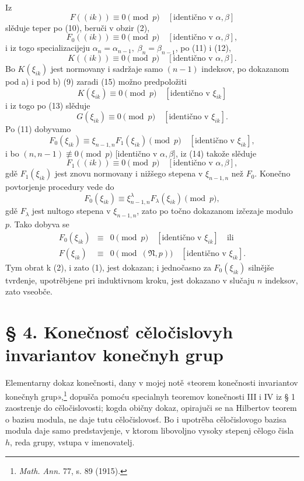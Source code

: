 \documentclass[11pt]{article}
\providecommand{\frN}{\mathfrak N}
\begin{document}
Iz
\[
        F((ik))\equiv0\pmod p\quad [\text{identično v \(\alpha,\beta\)}]
\]
slěduje teper po (10), beruči v obzir (2),
\begin{equation}
        F_0((ik))\equiv0\pmod p\quad [\text{identično v \(\alpha,\beta\)}],
\end{equation}
i iz togo specializacijeju \(\alpha_n=\alpha_{n-1},\;\beta_n=\beta_{n-1}\), po (11) i (12),
\begin{equation}
        K((ik))\equiv0\pmod p\quad [\text{identično v \(\alpha,\beta\)}].
\end{equation}
Bo \(K(\xi_{ik})\) jest normovany i sadržaje samo \((n-1)\) indeksov, po dokazanom pod a) i pod b) (9) zaradi (15) možno predpoložiti
\[
        K(\xi_{ik})\equiv0\pmod p\quad [\text{identično v \(\xi_{ik}\)}]
\]
i iz togo po (13) slěduje
\[
        G(\xi_{ik})\equiv0\pmod p\quad [\text{identično v \(\xi_{ik}\)}].
\]
Po (11) dobyvamo
\[
        F_0(\xi_{ik})\equiv\xi_{n-1,n}F_1(\xi_{ik})\pmod p\quad [\text{identično v \(\xi_{ik}\)}],
\]
i bo \((n,n-1)\not\equiv0\pmod p\) [identično v \(\alpha,\beta\)], iz (14) takože slěduje
\[
        F_1((ik))\equiv0\pmod p\quad [\text{identično v \(\alpha,\beta\)}],
\]
gdě \(F_1(\xi_{ik})\) jest znovu normovany i nižšego stepena v \(\xi_{n-1,n}\) než \(F_0\). Konečno povtorjenje procedury vede do
\[
        F_0(\xi_{ik})\equiv\xi_{n-1,n}^{\lambda}F_\lambda(\xi_{ik})\pmod p,
\]
gdě \(F_\lambda\) jest nultogo stepena v \(\xi_{n-1,n}\), zato po točno dokazanom izčezaje modulo \(p\). Tako dobyva se
\begin{equation}
\begin{array}{rcl}
        F_0(\xi_{ik})&\equiv&0\pmod p\quad [\text{identično v \(\xi_{ik}\)}]\quad \text{ili}\\
        F(\xi_{ik})&\equiv&0\pmod{(\frN,p)}\quad [\text{identično v \(\xi_{ik}\)}].
\end{array}
\end{equation}
Tym obrat k (2), i zato (1), jest dokazan; i jednočasno za \(F_0(\xi_{ik})\) silnějše tvrđenje, upotrěbjene pri induktivnom kroku, jest dokazano v slučaju \(n\) indeksov, zato vseobče.

\setcounter{equation}{0}
\section*{§ 4. Konečnosť cěločislovyh invariantov konečnyh grup}

Elementarny dokaz konečnosti, dany v mojej notě «teorem konečnosti invariantov konečnyh grup»,\footnote{\emph{Math. Ann.} 77, s. 89 (1915).} dopušča pomoću specialnyh teoremov konečnosti III i IV iz § 1 zaostrenje do cěločislovosti; kogda običny dokaz, opirajuči se na Hilbertov teorem o bazisu modula, ne daje tutu cěločislovosť. Bo i upotrěba cěločislovogo bazisa modula daje samo predstavjenje, v ktorom libovoljno vysoky stepenj cělogo čisla \(h\), reda grupy, vstupa v imenovatelj.
\end{document}
